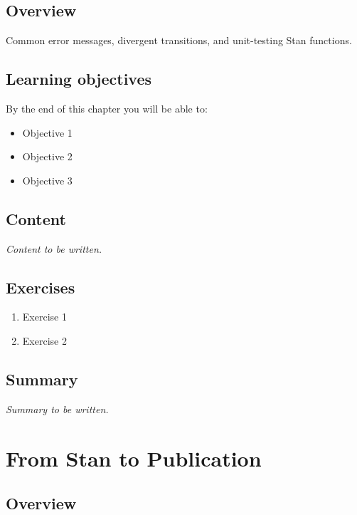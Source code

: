 \documentclass[
  11pt,
  a4paper,
  oneside,
  openany]{scrbook}
\providecommand{\tightlist}{%
  \setlength{\itemsep}{0pt}\setlength{\parskip}{0pt}}\usepackage{longtable,booktabs,array}
\begin{document}
\section{Overview}\label{overview-14}

Common error messages, divergent transitions, and unit-testing Stan
functions.

\section{Learning objectives}\label{learning-objectives-14}

By the end of this chapter you will be able to:

\begin{itemize}
\tightlist
\item[$\square$]
  Objective 1
\item[$\square$]
  Objective 2
\item[$\square$]
  Objective 3
\end{itemize}

\section{Content}\label{content-13}

\emph{Content to be written.}

\section{Exercises}\label{exercises-14}

\begin{enumerate}
\def\labelenumi{\arabic{enumi}.}
\tightlist
\item
  Exercise 1
\item
  Exercise 2
\end{enumerate}

\section{Summary}\label{summary-14}

\emph{Summary to be written.}

\chapter{From Stan to Publication}\label{from-stan-to-publication}

\section{Overview}\label{overview-15}
\end{document}
